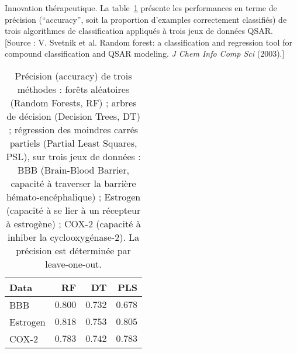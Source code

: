\documentclass[11pt,addpoints]{exam}
\begin{document}
\begin{questions}

\question[2] Innovation th\'erapeutique. La table~\ref{tab:chemoinformatics} pr\'esente les performances en terme de pr\'ecision (``accuracy'', soit la proportion d'examples correctement classifi\'es) de trois algorithmes de classification appliqu\'es \`a trois jeux de donn\'ees QSAR. [Source : V. Svetnik et al. Random forest: a classification and regression tool for compound classification and QSAR modeling. {\it J Chem Info Comp Sci} (2003).]
 
\begin{table}
  \centering
  \begin{tabular}{|l|r|r|r|} \hline
    Data & RF & DT & PLS \\ \hline
    BBB & $0.800$ & $0.732$ & $0.678$ \\
    Estrogen & $0.818$ & $0.753$ & $0.805$ \\
    COX-2 & $0.783$ & $0.742$ & $0.783$ \\ \hline
  \end{tabular}
  \caption{Pr\'ecision (accuracy) de trois m\'ethodes : for\^ets al\'eatoires (Random Forests, RF) ; arbres de d\'ecision (Decision Trees, DT) ; r\'egression des moindres carr\'es partiels (Partial Least Squares, PSL), sur trois jeux de donn\'ees : BBB (Brain-Blood Barrier, capacit\'e \`a traverser la barri\`ere h\'emato-enc\'ephalique) ; Estrogen (capacit\'e \`a se lier \`a un r\'ecepteur \`a estrog\`ene) ; COX-2 (capacit\'e \`a inhiber la cyclooxyg\'enase-2). La pr\'ecision est d\'etermin\'ee par leave-one-out.}
  \label{tab:chemoinformatics}
\end{table}


\end{questions}
\end{document}
